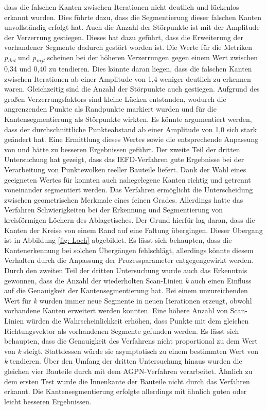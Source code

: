 dass die falschen Kanten zwischen Iterationen nicht deutlich und lückenlos erkannt wurden. Dies führte dazu, dass die Segmentierung dieser falschen Kanten unvollständig erfolgt hat. Auch die Anzahl der Störpunkte ist mit der Amplitude der Verzerrung gestiegen. Dieses hat dazu geführt, dass die Erweiterung der vorhandener Segmente dadurch gestört worden ist. Die Werte für die Metriken  \textit{p\textsubscript{dct}} und \textit{p\textsubscript{mjt}} scheinen bei der höheren Verzerrungen gegen einem Wert zwischen 0,34 und 0,40 zu tendieren. Dies könnte daran liegen, dass die falschen Kanten zwischen Iterationen ab einer Amplitude von 1,4 weniger deutlich zu erkennen waren. Gleichzeitig sind die Anzahl der Störpunkte auch gestiegen. Aufgrund des großen Verzerrungsfaktors sind kleine Lücken entstanden, wodurch die angrenzenden Punkte als Randpunkte markiert wurden und für die Kantensegmentierung als Störpunkte wirkten. Es könnte argumentiert werden, dass der durchschnittliche Punkteabstand ab einer Amplitude von 1,0 sich stark geändert hat. Eine Ermittlung dieses Wertes sowie die entsprechende Anpassung von \distthresha und \distthreshb hätte zu besseren Ergebnissen geführt. Der zweite Teil der dritten Untersuchung hat gezeigt, dass das IEFD-Verfahren gute Ergebnisse bei der Verarbeitung von Punktewolken reeller Bauteile liefert. Dank der Wahl eines geeigneten Wertes für \distthreshb konnten auch nahegelegene Kanten richtig und getrennt voneinander segmentiert werden. Das Verfahren ermöglicht die Unterscheidung zwischen geometrischen Merkmale eines feinen Grades. Allerdings hatte das Verfahren Schwierigkeiten bei der Erkennung und Segmentierung von kreisförmigen Löchern des Ablagetisches. Der Grund hierfür lag daran, dass die Kanten der Kreise von einem Rand auf eine Faltung übergingen. Dieser Übergang ist in Abbildung \ref{fig: Loch} abgebildet. Es lässt sich behaupten, dass die Kantenerkennung bei solchen Übergängen fehlschlägt, allerdings könnte diesem Verhalten durch die Anpassung der Prozessparameter entgegengewirkt werden. Durch den zweiten Teil der dritten Untersuchung wurde auch das Erkenntnis gewonnen, dass die Anzahl der wiederholten Scan-Linien \textit{k} auch einen Einfluss auf die Genauigkeit der Kantensegmentierung hat. Bei einem unzureichenden Wert für \textit{k} wurden immer neue Segmente in neuen Iterationen erzeugt, obwohl vorhandene Kanten erweitert werden konnten. Eine höhere Anzahl von Scan-Linien würden die Wahrscheinlichkeit erhöhen, dass Punkte mit dem gleichen Richtungsvektor als vorhandenen Segmente gefunden werden. Es lässt sich behaupten, dass die Genauigkeit des Verfahrens nicht proportional zu dem Wert von \textit{k} steigt. Stattdessen würde sie asymptotisch zu einem bestimmten Wert von \textit{k} tendieren. Über den Umfang der dritten Untersuchung hinaus wurden die gleichen vier Bauteile durch mit dem AGPN-Verfahren verarbeitet. Ähnlich zu dem ersten Test wurde die Innenkante der Bauteile nicht durch das Verfahren erkannt. Die Kantensegmentierung erfolgte allerdings mit ähnlich guten oder leicht besseren Ergebnissen. 

